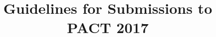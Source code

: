 \documentclass[pageno]{jpaper}
\newcommand{\pactyear}{17}
\newcommand{\pactcompyear}{20\pactyear}
\begin{document}
\title{
Guidelines for Submissions to PACT \pactcompyear}

\date{}
\maketitle

\thispagestyle{empty}




















\end{document}
